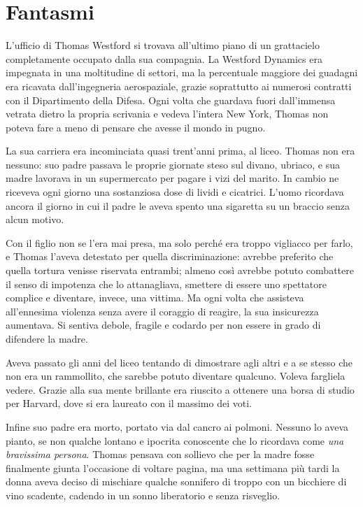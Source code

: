 \chapter{Fantasmi}
\label{ch:fantasmi}

L'ufficio di Thomas Westford si trovava all'ultimo piano di un grattacielo completamente occupato
dalla sua compagnia. La Westford Dynamics era impegnata in una moltitudine di settori, ma la
percentuale maggiore dei guadagni era ricavata dall'ingegneria aerospaziale, grazie soprattutto ai
numerosi contratti con il Dipartimento della Difesa. Ogni volta che guardava fuori dall'immensa
vetrata dietro la propria scrivania e vedeva l'intera New York, Thomas non poteva fare a meno di
pensare che avesse il mondo in pugno.

La sua carriera era incominciata quasi trent'anni prima, al liceo. Thomas non era nessuno: suo padre
passava le proprie giornate steso sul divano, ubriaco, e sua madre lavorava in un supermercato per
pagare i vizi del marito. In cambio ne riceveva ogni giorno una sostanziosa dose di lividi e
cicatrici. L'uomo ricordava ancora il giorno in cui il padre le aveva spento una sigaretta su un
braccio senza alcun motivo.

Con il figlio non se l'era mai presa, ma solo perché era troppo vigliacco per farlo, e Thomas
l'aveva detestato per quella discriminazione: avrebbe preferito che quella tortura venisse riservata
entrambi; almeno così avrebbe potuto combattere il senso di impotenza che lo attanagliava, smettere
di essere uno spettatore complice e diventare, invece, una vittima. Ma ogni volta che assisteva
all'ennesima violenza senza avere il coraggio di reagire, la sua insicurezza aumentava. Si sentiva
debole, fragile e codardo per non essere in grado di difendere la madre.

Aveva passato gli anni del liceo tentando di dimostrare agli altri e a se stesso che non era un
rammollito, che sarebbe potuto diventare qualcuno. Voleva fargliela vedere. Grazie alla sua mente
brillante era riuscito a ottenere una borsa di studio per Harvard, dove si era laureato con il
massimo dei voti.

Infine suo padre era morto, portato via dal cancro ai polmoni. Nessuno lo aveva pianto, se non
qualche lontano e ipocrita conoscente che lo ricordava come \emph{una bravissima persona}. Thomas
pensava con sollievo che per la madre fosse finalmente giunta l'occasione di voltare pagina, ma una
settimana più tardi la donna aveva deciso di mischiare qualche sonnifero di troppo con un bicchiere
di vino scadente, cadendo in un sonno liberatorio e senza risveglio.

